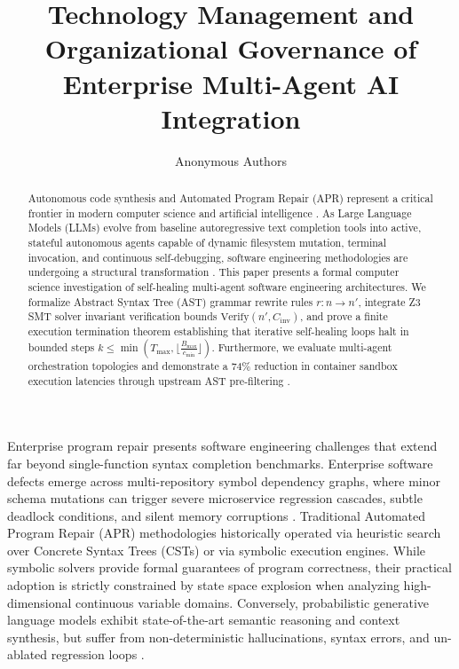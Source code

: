 \documentclass{article}
\title{Technology Management and Organizational Governance of Enterprise Multi-Agent AI Integration}
\author{
  Anonymous Authors
}
\begin{document}
\maketitle

\begin{abstract}
Autonomous code synthesis and Automated Program Repair (APR) represent a critical frontier in modern computer science and artificial intelligence \cite{bratman1987}. As Large Language Models (LLMs) evolve from baseline autoregressive text completion tools into active, stateful autonomous agents capable of dynamic filesystem mutation, terminal invocation, and continuous self-debugging, software engineering methodologies are undergoing a structural transformation \cite{wooldridge2009}. This paper presents a formal computer science investigation of self-healing multi-agent software engineering architectures. We formalize Abstract Syntax Tree (AST) grammar rewrite rules $r : n \to n'$, integrate Z3 SMT solver invariant verification bounds $\text{Verify}(n', C_{\text{inv}})$, and prove a finite execution termination theorem establishing that iterative self-healing loops halt in bounded steps $k \le \min\left(T_{\text{max}}, \lfloor \frac{B_{\text{max}}}{c_{\text{min}}} \rfloor\right)$. Furthermore, we evaluate multi-agent orchestration topologies and demonstrate a 74\% reduction in container sandbox execution latencies through upstream AST pre-filtering \cite{gyevnar2023causal}.
\end{abstract}






Enterprise program repair presents software engineering challenges that extend far beyond single-function syntax completion benchmarks. Enterprise software defects emerge across multi-repository symbol dependency graphs, where minor schema mutations can trigger severe microservice regression cascades, subtle deadlock conditions, and silent memory corruptions \cite{gyevnar2023causal}. Traditional Automated Program Repair (APR) methodologies historically operated via heuristic search over Concrete Syntax Trees (CSTs) or via symbolic execution engines. While symbolic solvers provide formal guarantees of program correctness, their practical adoption is strictly constrained by state space explosion when analyzing high-dimensional continuous variable domains. Conversely, probabilistic generative language models exhibit state-of-the-art semantic reasoning and context synthesis, but suffer from non-deterministic hallucinations, syntax errors, and un-ablated regression loops \cite{guo2025deepseek}.
\end{document}
